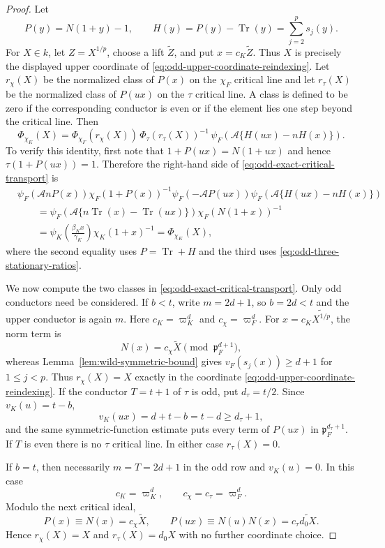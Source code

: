 \documentclass[11pt]{amsart}
\theoremstyle{definition}
\theoremstyle{remark}
\newcommand{\p}{\mathfrak p}
\newcommand{\Tr}{\operatorname{Tr}}
\begin{document}
\begin{proof}
Let
\[
 P(y)=N(1+y)-1,
 \qquad
 H(y)=P(y)-\Tr(y)=\sum_{j=2}^{p}s_j(y).
\]
For $X\in k$, let $Z=X^{1/p}$, choose a lift $\widetilde Z$, and put
$x=c_K\widetilde Z$.  Thus $X$ is precisely the displayed upper
coordinate of \eqref{eq:odd-upper-coordinate-reindexing}.  Let
$r_\chi(X)$ be the normalized class of $P(x)$ on the $\chi_F$ critical
line and let $r_\tau(X)$ be the normalized class of $P(ux)$ on the
$\tau$ critical line.  A class is defined to be zero if the
corresponding conductor is even or if the element lies one step beyond
the critical line.  Then
\begin{equation}\label{eq:odd-exact-critical-transport}
 \Phi_{\chi_K}(X)
 =\Phi_{\chi_F}(r_\chi(X))\,
  \Phi_\tau(r_\tau(X))^{-1}\,
  \psi_F\!\left(\mathcal A\{H(ux)-nH(x)\}\right).
\end{equation}
To verify this identity, first note that
$1+P(ux)=N(1+ux)$ and hence
$\tau(1+P(ux))=1$.  Therefore the right-hand side of
\eqref{eq:odd-exact-critical-transport} is
\begin{align*}
 &\psi_F(\mathcal A nP(x))\chi_F(1+P(x))^{-1}
  \psi_F(-\mathcal A P(ux))
  \psi_F\!\left(\mathcal A\{H(ux)-nH(x)\}\right)\\
 &\qquad=
 \psi_F\!\left(\mathcal A\{n\Tr(x)-\Tr(ux)\}\right)
 \chi_F(N(1+x))^{-1}\\
 &\qquad=
 \psi_K\!\left(\frac{\beta_Kx}{\gamma_K}\right)
 \chi_K(1+x)^{-1}
 =\Phi_{\chi_K}(X),
\end{align*}
where the second equality uses $P=\Tr+H$ and the third uses
\eqref{eq:odd-three-stationary-ratios}.

We now compute the two classes in
\eqref{eq:odd-exact-critical-transport}.  Only odd conductors need be
considered.  If $b<t$, write $m=2d+1$, so $b=2d<t$ and the upper
conductor is again $m$.  Here $c_K=\varpi_K^d$ and
$c_\chi=\varpi_F^d$.  For
$x=c_K\widetilde{X^{1/p}}$, the norm term is
\[
 N(x)=c_\chi\widetilde X
 \pmod{\p_F^{d+1}},
\]
whereas Lemma~\ref{lem:wild-symmetric-bound} gives
$v_F(s_j(x))\ge d+1$ for $1\le j<p$.  Thus $r_\chi(X)=X$ exactly in
the coordinate \eqref{eq:odd-upper-coordinate-reindexing}.  If the
conductor $T=t+1$ of $\tau$ is odd, put $d_\tau=t/2$.  Since
$v_K(u)=t-b$,
\[
 v_K(ux)=d+t-b=t-d\ge d_\tau+1,
\]
and the same symmetric-function estimate puts every term of $P(ux)$
in $\p_F^{d_\tau+1}$.  If $T$ is even there is no $\tau$ critical
line.  In either case $r_\tau(X)=0$.

If $b=t$, then necessarily $m=T=2d+1$ in the odd row and
$v_K(u)=0$.  In this case
\[
 c_K=\varpi_K^d,
 \qquad c_\chi=c_\tau=\varpi_F^d.
\]
Modulo the next critical ideal,
\[
 P(x)\equiv N(x)=c_\chi\widetilde X,
 \qquad
 P(ux)\equiv N(u)N(x)=c_\tau\widetilde{d_0X}.
\]
Hence $r_\chi(X)=X$ and $r_\tau(X)=d_0X$ with no further coordinate
choice.


\end{proof}
\end{document}
